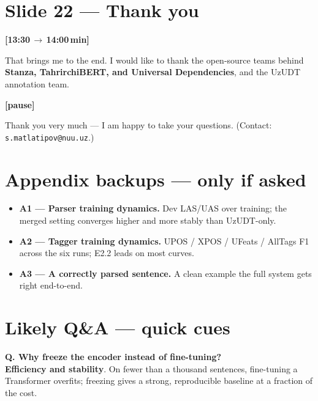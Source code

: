 \documentclass[12pt,a4paper]{article}
\newcommand{\timing}[2]{%
   \par\noindent\textbf{\small [#1\,$\to$\,#2\,min]}\par\vspace{0.2em}}
\newcommand{\pause}{\par\vspace{0.4em}\textbf{[pause]}\par}
\begin{document}
\section*{Slide 22 --- Thank you}
\timing{13:30}{14:00}

That brings me to the end. I would like to thank the open-source teams
behind \textbf{Stanza, TahrirchiBERT, and Universal Dependencies}, and
the UzUDT annotation team.

\pause

Thank you very much --- I am happy to take your questions.
(Contact: \texttt{s.matlatipov@nuu.uz}.)

\newpage
\section*{Appendix backups --- only if asked}

\begin{itemize}
   \item \textbf{A1 --- Parser training dynamics.} Dev LAS/UAS over training; the merged setting converges higher and more stably than UzUDT-only.
   \item \textbf{A2 --- Tagger training dynamics.} UPOS / XPOS / UFeats / AllTags F1 across the six runs; E2.2 leads on most curves.
   \item \textbf{A3 --- A correctly parsed sentence.} A clean example the full system gets right end-to-end.
\end{itemize}

\newpage
\section*{Likely Q\&A --- quick cues}

\noindent\textbf{Q. Why freeze the encoder instead of fine-tuning?}\\
\textbf{Efficiency and stability}. On fewer than a thousand sentences,
fine-tuning a Transformer overfits; freezing gives a strong, reproducible
baseline at a fraction of the cost.
\end{document}
